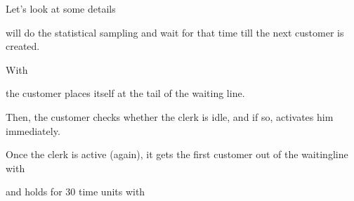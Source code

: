\documentclass[letterpaper,10pt,english]{sphinxmanual}
\begin{document}
Let’s look at some details

%
\begin{sphinxVerbatim}[commandchars=\\\{\}]
  
\end{sphinxVerbatim}

will do the statistical sampling and wait for that time till the next customer is created.

With

%
\begin{sphinxVerbatim}[commandchars=\\\{\}]
\end{sphinxVerbatim}

the customer places itself at the tail of the waiting line.

Then, the customer checks whether the clerk is idle, and if so, activates him immediately.

%
\begin{sphinxVerbatim}[commandchars=\\\{\}]
 
\end{sphinxVerbatim}

Once the clerk is active (again), it gets the first customer out of the waitingline with

%
\begin{sphinxVerbatim}[commandchars=\\\{\}]
  
\end{sphinxVerbatim}

and holds for 30 time units with

%
\begin{sphinxVerbatim}[commandchars=\\\{\}]
 
\end{sphinxVerbatim}
\end{document}
